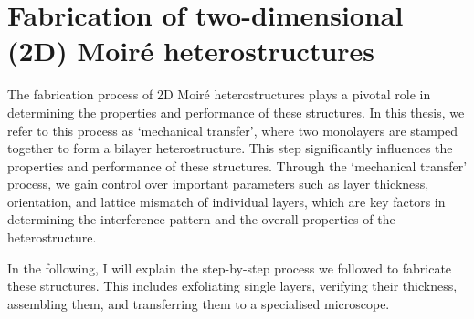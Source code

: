 \section{Fabrication of two-dimensional (2D) Moiré heterostructures}
\label{sec:methods}
%


The fabrication process of 2D Moir\'e heterostructures plays a pivotal role in determining the properties and performance of these structures. In this thesis, we refer to this process as `mechanical transfer', where two monolayers are stamped together to form a bilayer heterostructure. This step significantly influences the properties and performance of these structures. 
%
Through the `mechanical transfer' process, we gain control over important parameters such as layer thickness, orientation, and lattice mismatch of individual layers, which are key factors in determining the interference pattern and the overall properties of the heterostructure.

In the following, I will explain the step-by-step process we followed to fabricate these structures. This includes exfoliating single layers, verifying their thickness, assembling them, and transferring them to a specialised microscope.


